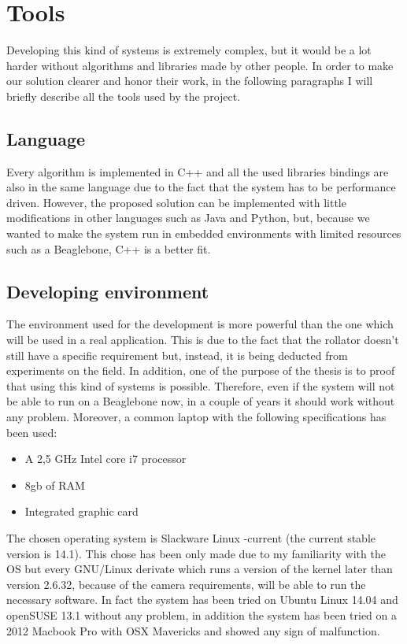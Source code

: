 \chapter{Tools}
\vspace{6cm}
Developing this kind of systems is extremely complex, but it would be a lot harder without algorithms and libraries made by other people.
In order to make our solution clearer and honor their work, in the following paragraphs I will briefly describe all the tools used by the project.
\newpage

\section{Language}
Every algorithm is implemented in C++ and all the used libraries bindings are also in the same language due to the fact that the system has to be performance driven. However, the proposed solution can be implemented with little modifications in other languages such as Java and Python, but, because we wanted to make the system run in embedded environments with limited resources such as a Beaglebone, C++ is a better fit.        

\section{Developing environment}
The environment used for the development is more powerful than the one which will be used in a real application. This is due to the fact that the rollator doesn't still have a specific requirement but, instead, it is being deducted from experiments on the field. In addition, one of the purpose of the thesis is to proof that using this kind of systems is possible. Therefore, even if the system will not be able to run on a Beaglebone now, in a couple of years it should work without any problem.
\newline 
Moreover, a common laptop with the following specifications has been used:
\begin{itemize}
  \item A 2,5 GHz Intel core i7 processor
  \item 8gb of RAM
  \item Integrated graphic card
\end{itemize}
The chosen operating system is Slackware Linux -current (the current stable version is 14.1). This chose has been only made due to my familiarity with the OS but every GNU/Linux derivate which runs a version of the kernel later than version 2.6.32, because of the camera requirements, will be able to run the necessary software.
In fact the system has been tried on Ubuntu Linux 14.04 and openSUSE 13.1 without any problem, in addition the system has been tried on a 2012 Macbook Pro with OSX Mavericks and showed any sign of malfunction. 


